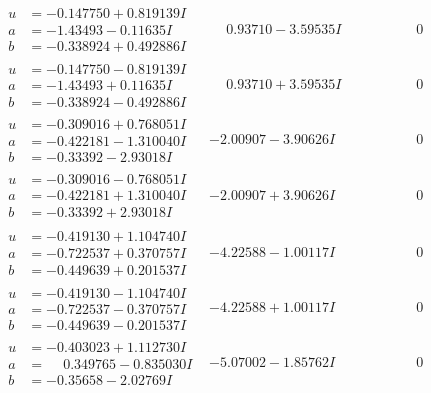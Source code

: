 \documentclass[1p]{elsarticle_modified}
\theoremstyle{definition}
\begin{document}
$$\begin{array}{c|c|c}
\begin{aligned}
u &= -0.147750 + 0.819139 I \\
a &= -1.43493 - 0.11635 I \\
b &= -0.338924 + 0.492886 I\end{aligned}
 & \phantom{-}0.93710 - 3.59535 I & \phantom{-0.000000 } 0 \\ \hline\begin{aligned}
u &= -0.147750 - 0.819139 I \\
a &= -1.43493 + 0.11635 I \\
b &= -0.338924 - 0.492886 I\end{aligned}
 & \phantom{-}0.93710 + 3.59535 I & \phantom{-0.000000 } 0 \\ \hline\begin{aligned}
u &= -0.309016 + 0.768051 I \\
a &= -0.422181 - 1.310040 I \\
b &= -0.33392 - 2.93018 I\end{aligned}
 & -2.00907 - 3.90626 I & \phantom{-0.000000 } 0 \\ \hline\begin{aligned}
u &= -0.309016 - 0.768051 I \\
a &= -0.422181 + 1.310040 I \\
b &= -0.33392 + 2.93018 I\end{aligned}
 & -2.00907 + 3.90626 I & \phantom{-0.000000 } 0 \\ \hline\begin{aligned}
u &= -0.419130 + 1.104740 I \\
a &= -0.722537 + 0.370757 I \\
b &= -0.449639 + 0.201537 I\end{aligned}
 & -4.22588 - 1.00117 I & \phantom{-0.000000 } 0 \\ \hline\begin{aligned}
u &= -0.419130 - 1.104740 I \\
a &= -0.722537 - 0.370757 I \\
b &= -0.449639 - 0.201537 I\end{aligned}
 & -4.22588 + 1.00117 I & \phantom{-0.000000 } 0 \\ \hline\begin{aligned}
u &= -0.403023 + 1.112730 I \\
a &= \phantom{-}0.349765 - 0.835030 I \\
b &= -0.35658 - 2.02769 I\end{aligned}
 & -5.07002 - 1.85762 I & \phantom{-0.000000 } 0 \\ \hline\begin{aligned}

\end{aligned}
\end{array}$$
\end{document}
